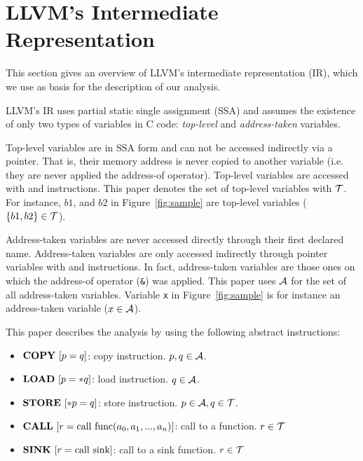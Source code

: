 \section{LLVM's Intermediate Representation}\label{sec:llvm}

This section gives an overview of LLVM's intermediate
representation (IR), which we use as basis for the
description of our analysis.

LLVM's IR uses partial static single assignment (SSA)
and assumes the existence of only two types of variables
in C code: \textit{top-level} and \textit{address-taken}
variables.

Top-level variables are in SSA form and can not be
accessed indirectly via a pointer. That is, their memory
address is never copied to another variable (i.e. they are
never applied the address-of operator). Top-level variables
are accessed with \alloct and \copyt instructions.
This paper denotes the set of top-level variables
with $\mathcal{T}$. For instance, $b1$, and $b2$ in Figure~\ref{fig:sample}
are top-level variables ($\{b1, b2\} \in \mathcal{T}$).

Address-taken variables are never accessed directly through
their first declared name. Address-taken variables are only
accessed indirectly through pointer variables with \loadt and
\storet instructions. In fact, address-taken variables
are those ones on which the address-of operator (\texttt{\&})
was applied. This paper uses $\mathcal{A}$ for the set of all address-taken
variables. Variable \texttt{x} in Figure~\ref{fig:sample} is
for instance an address-taken variable ($x \in \mathcal{A}$).

This paper describes the analysis by using the following abstract
instructions:
\begin{itemize}
\item $\text{\textbf{COPY}}\ [p = q]$: copy instruction. $p, q \in \mathcal{A}$.
\item $\text{\textbf{LOAD}}\ [p = *q]$: load instruction. $q \in \mathcal{A}$.
\item $\text{\textbf{STORE}}\ [*p = q]$: store instruction. $p \in \mathcal{A}, q \in \mathcal{T}$.
\item $\text{\textbf{CALL}}\ [r = \text{call}\ \text{func}(a_0, a_1, ..., a_n)]$: call to a function. $r \in \mathcal{T}$
\item $\text{\textbf{SINK}}\ [r = \text{call}\ \text{sink}]$: call to a sink function. $r \in \mathcal{T}$
\end{itemize}
